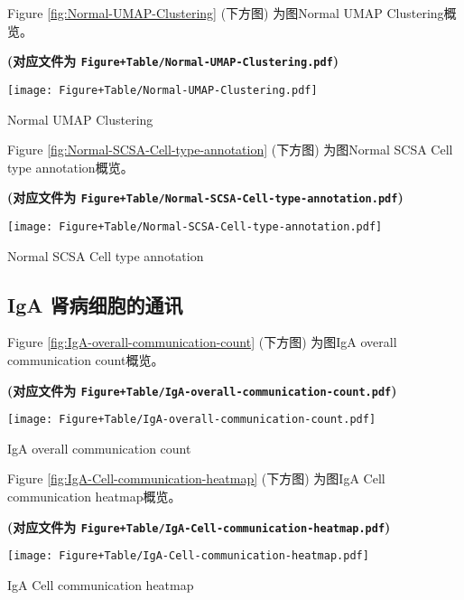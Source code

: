 \documentclass[
]{article}
\begin{document}
Figure \ref{fig:Normal-UMAP-Clustering} (下方图) 为图Normal UMAP Clustering概览。

\textbf{(对应文件为 \texttt{Figure+Table/Normal-UMAP-Clustering.pdf})}

\def\@captype{figure}
\begin{center}
\texttt{[image: Figure+Table/Normal-UMAP-Clustering.pdf]}
\caption{Normal UMAP Clustering}\label{fig:Normal-UMAP-Clustering}
\end{center}

Figure \ref{fig:Normal-SCSA-Cell-type-annotation} (下方图) 为图Normal SCSA Cell type annotation概览。

\textbf{(对应文件为 \texttt{Figure+Table/Normal-SCSA-Cell-type-annotation.pdf})}

\def\@captype{figure}
\begin{center}
\texttt{[image: Figure+Table/Normal-SCSA-Cell-type-annotation.pdf]}
\caption{Normal SCSA Cell type annotation}\label{fig:Normal-SCSA-Cell-type-annotation}
\end{center}

\hypertarget{iga-ux80beux75c5ux7ec6ux80deux7684ux901aux8baf}{%
\subsection{IgA 肾病细胞的通讯}\label{iga-ux80beux75c5ux7ec6ux80deux7684ux901aux8baf}}

Figure \ref{fig:IgA-overall-communication-count} (下方图) 为图IgA overall communication count概览。

\textbf{(对应文件为 \texttt{Figure+Table/IgA-overall-communication-count.pdf})}

\def\@captype{figure}
\begin{center}
\texttt{[image: Figure+Table/IgA-overall-communication-count.pdf]}
\caption{IgA overall communication count}\label{fig:IgA-overall-communication-count}
\end{center}

Figure \ref{fig:IgA-Cell-communication-heatmap} (下方图) 为图IgA Cell communication heatmap概览。

\textbf{(对应文件为 \texttt{Figure+Table/IgA-Cell-communication-heatmap.pdf})}

\def\@captype{figure}
\begin{center}
\texttt{[image: Figure+Table/IgA-Cell-communication-heatmap.pdf]}
\caption{IgA Cell communication heatmap}\label{fig:IgA-Cell-communication-heatmap}
\end{center}
\end{document}
